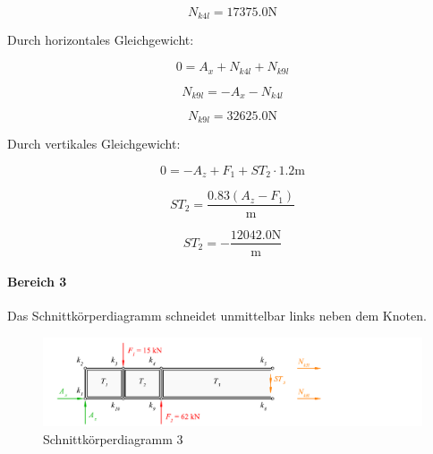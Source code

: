 \documentclass[
  12pt,
  letterpaper,
  DIV=11,
  egregdoesnotlikesansseriftitles]{scrartcl}
\let\oldparagraph\paragraph
\renewcommand{\paragraph}[1]{\oldparagraph{#1}\mbox{}}
\begin{document}
\begin{equation}N_{k4l} = 17375.0 \text{N}\end{equation}

Durch horizontales Gleichgewicht:

\begin{equation}0 = A_{x} + N_{k4l} + N_{k9l}\end{equation}

\begin{equation}N_{k9l} = - A_{x} - N_{k4l}\end{equation}

\begin{equation}N_{k9l} = 32625.0 \text{N}\end{equation}

Durch vertikales Gleichgewicht:

\begin{equation}0 = - A_{z} + F_{1} + ST_{2} \cdot 1.2 \text{m}\end{equation}

\begin{equation}ST_{2} = \frac{0.83 \left(A_{z} - F_{1}\right)}{\text{m}}\end{equation}

\begin{equation}ST_{2} = - \frac{12042.0 \text{N}}{\text{m}}\end{equation}

\hypertarget{bereich-3}{%
\paragraph{Bereich 3}\label{bereich-3}}

Das Schnittkörperdiagramm schneidet unmittelbar links neben dem Knoten.

\begin{figure}[H]

{\centering \includegraphics{BSI_HS23_Testat_03_files/mediabag/../images/Testat_03_HS23_SKD2.pdf}

}

\caption{\label{fig-skd3}Schnittkörperdiagramm 3}

\end{figure}
\end{document}
